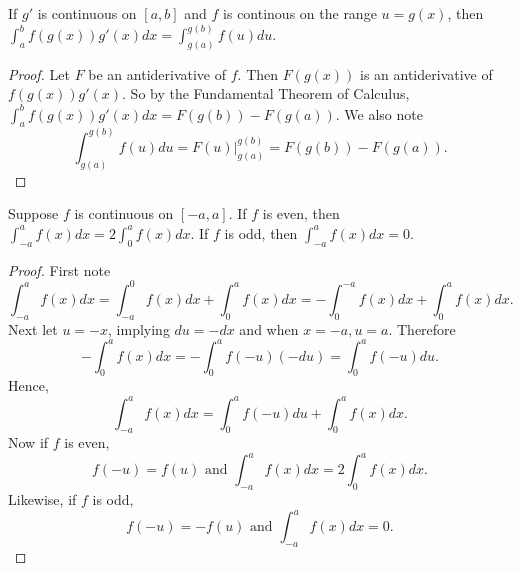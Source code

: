 \documentclass[a4paper,8pt]{article}
\begin{document}
\begin{outline}
    If \(g'\) is continuous on \([a, b]\) and \(f\) is continous on the range \(u=g(x)\), then
    \(\int_a^b f(g(x))g'(x)dx = \int_{g(a)}^{g(b)} f(u)du\).

    \begin{proof}
      Let \(F\) be an antiderivative of \(f\). Then \(F(g(x))\) is an antiderivative of \(f(g(x))g'(x)\). So
      by the Fundamental Theorem of Calculus, \(\int_a^b f(g(x))g'(x)dx = F(g(b)) - F(g(a))\). We also note
      \[ \int_{g(a)}^{g(b)} f(u)du = F(u)\vert_{g(a)}^{g(b)} = F(g(b))-F(g(a))\text{.} \]
    \end{proof}

    Suppose \(f\) is continuous on \([-a, a]\). If \(f\) is even, then \(\int_{-a}^{a}f(x)dx = 2\int_0^a f(x)dx\).
    If \(f\) is odd, then \(\int_{-a}^a f(x)dx = 0\).

    \begin{proof}
      First note
      \[
        \int_{-a}^a f(x)dx
          = \int_{-a}^0 f(x)dx + \int_0^a f(x)dx
          = -\int_0^{-a} f(x)dx + \int_0^a f(x)dx\text{.}
      \]
      Next let \(u = -x\), implying \(du = -dx\) and when \(x = -a, u = a\). Therefore
      \[
        -\int_0^a f(x)dx = -\int_0^a f(-u)(-du) = \int_0^a f(-u)du\text{.}
      \]
      Hence, \[\int_{-a}^a f(x)dx = \int_0^a f(-u)du + \int_0^a f(x)dx\text{.}\]
      Now if \(f\) is even, \[f(-u)=f(u)\text{ and }\int_{-a}^a f(x)dx = 2\int_0^a f(x)dx\text{.}\]
      Likewise, if \(f\) is odd, \[f(-u) = -f(u)\text{ and }\int_{-a}^a f(x)dx = 0\text{.}\]
    \end{proof}

\end{outline}
\end{document}
